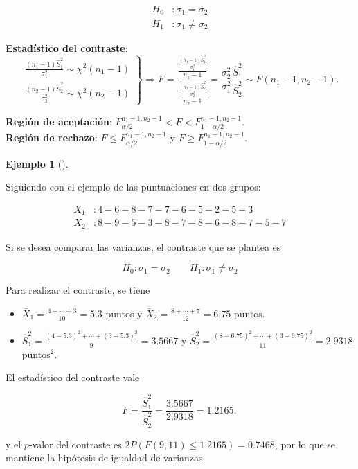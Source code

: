 \documentclass[
  a4paper,
]{scrreport}
\providecommand{\tightlist}{%
  \setlength{\itemsep}{0pt}\setlength{\parskip}{0pt}}\usepackage{longtable,booktabs,array}
\theoremstyle{plain}
\theoremstyle{definition}
\newtheorem{example}{Ejemplo}[chapter]
\theoremstyle{definition}
\theoremstyle{remark}
\begin{document}
\begin{align*}
H_0 &: \sigma_1=\sigma_2 \\
H_1 &: \sigma_1\neq \sigma_2
\end{align*}

\textbf{Estadístico del contraste}: \[\left.
\begin{array}{l}
\displaystyle \frac{(n_1-1)\hat{S}_1^2}{\sigma_1^2}\sim \chi^2(n_1-1) \\
\displaystyle \frac{(n_2-1)\hat{S}_2^2}{\sigma_2^2}\sim \chi^2(n_2-1)
\end{array}
\right\}
\Rightarrow
F= \frac{\frac{\frac{(n_1-1)\hat{S}_1^2}{\sigma_1^2}}{n_1-1}}{\frac{\frac{(n_2-1)\hat{S}_2^2}{\sigma_2^2}}{n_2-1}} =
\frac{\sigma_2^2}{\sigma_1^2}\frac{\hat{S}_1^2}{\hat{S}_2^2}\sim F(n_1-1,n_2-1).
\]

\textbf{Región de aceptación}:
\(F_{\alpha/2}^{n_1-1,n_2-1} < F < F_{1-\alpha/2}^{n_1-1,n_2-1}\).\\
\textbf{Región de rechazo}: \(F\leq F_{\alpha/2}^{n_1-1,n_2-1}\) y
\(F\geq F_{1-\alpha/2}^{n_1-1,n_2-1}\).

\begin{example}[]\protect\hypertarget{exm-contraste-comparacion-varianzas}{}\label{exm-contraste-comparacion-varianzas}

Siguiendo con el ejemplo de las puntuaciones en dos grupos:

\begin{align*}
X_1 &: 4 - 6 - 8 - 7 - 7 - 6 - 5 - 2 - 5 - 3  \\
X_2 &: 8 - 9 - 5 - 3 - 8 - 7 - 8 - 6 - 8 - 7 - 5 - 7
\end{align*}

Si se desea comparar las varianzas, el contraste que se plantea es

\[
H_0: \sigma_1=\sigma_2\qquad H_1: \sigma_1\neq \sigma_2
\]

Para realizar el contraste, se tiene

\begin{itemize}
\tightlist
\item
  \(\bar{X}_1 = \frac{4+\cdots +3}{10}=5.3\) puntos y
  \(\bar{X}_2=\frac{8+\cdots +7}{12}=6.75\) puntos.
\item
  \(\hat{S}_1^2= \frac{(4-5.3)^2+\cdots + (3-5.3)^2}{9}=3.5667\) y
  \(\hat{S}_2^2= \frac{(8-6.75)^2+\cdots + (3-6.75)^2}{11}=2.9318\)
  puntos\(^2\).
\end{itemize}

El estadístico del contraste vale

\[
F = \frac{\hat{S}_1^2}{\hat{S}_2^2} = \frac{3.5667}{2.9318}=1.2165,
\]

y el \(p\)-valor del contraste es \(2P(F(9,11)\leq 1.2165)=0.7468\), por
lo que se mantiene la hipótesis de igualdad de varianzas.

\end{example}
\end{document}
